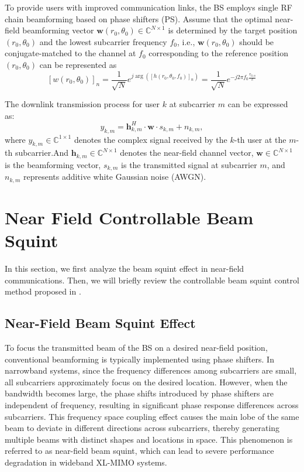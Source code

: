 \documentclass[lettersize,journal]{IEEEtran}
\begin{document}
To provide users with improved communication links, the BS employs single RF chain beamforming based on phase shifters (PS). Assume that the optimal near-field beamforming vector $\mathbf{w}(r_{0},\theta_{0}) \in \mathbb{C}^{N\times 1}$ is determined by the target position $(r_{0},\theta_{0})$ and the lowest subcarrier frequency $f_0$, i.e., $\mathbf{w}(r_{0},\theta_{0})$ should be conjugate-matched to the channel at $f_0$ corresponding to the reference position $(r_{0},\theta_{0})$ can be represented as
	\begin{equation}
		{{[w({{r}_{0}},{{\theta }_{0}})]}_{n}}=\frac{1}{\sqrt{N}}{{e}^{j\arg \left( {{[h({{r}_{0}},{{\theta }_{0}},{{f}_{0}})]}_{n}} \right)}}=\frac{1}{\sqrt{N}}{{e}^{-j2\pi {{f}_{0}}\frac{{{r}_{0,n}}}{c}}}
	\end{equation}

The downlink transmission process for user $k$ at subcarrier $m$ can be expressed as:
\begin{equation}
		y_{k,m}=\mathbf{h}_{k,m}^H\cdot\mathbf{w}\cdot s_{k,m}+n_{k,m},
	\end{equation}
where $y_{k,m} \in \mathbb{C}^{1 \times 1}$ denotes the complex signal received by the $k$-th user at the $m$-th subcarrier.And $\mathbf{h}_{k,m} \in \mathbb{C}^{N \times 1}$ denotes the near-field channel vector, $\mathbf{w} \in \mathbb{C}^{N \times 1}$ is the beamforming vector, $s_{k,m}$ is the transmitted signal at subcarrier $m$, and $n_{k,m}$ represents additive white Gaussian noise (AWGN).

\section{Near Field Controllable Beam Squint}
\label{sec:beam_squint}

In this section, we first analyze the beam squint effect in near-field communications. Then, we will briefly review the controllable beam squint control method proposed in \cite{luo2023beam}.

\subsection{Near-Field Beam Squint Effect}
To focus the transmitted beam of the BS on a desired near-field position, conventional beamforming is typically implemented using phase shifters. In narrowband systems, since the frequency differences among subcarriers are small, all subcarriers approximately focus on the desired location. However, when the bandwidth becomes large, the phase shifts introduced by phase shifters are independent of frequency, resulting in significant phase response differences across subcarriers. This frequency space coupling effect causes the main lobe of the same beam to deviate in different directions across subcarriers, thereby generating multiple beams with distinct shapes and locations in space. This phenomenon is referred to as near-field beam squint, which can lead to severe performance degradation in wideband XL-MIMO systems.
\end{document}
